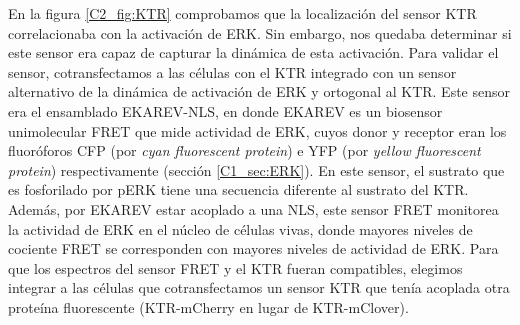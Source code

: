 \documentclass[./main.tex]{subfiles}
\begin{document}
En la figura \ref{C2_fig:KTR} comprobamos que la localización del sensor KTR correlacionaba con la activación de ERK. Sin embargo, nos quedaba determinar si este sensor era capaz de capturar la dinámica de esta activación. Para validar el sensor, cotransfectamos a las células con el KTR integrado con un sensor alternativo de la dinámica de activación de ERK y ortogonal al KTR. Este sensor era el ensamblado EKAREV-NLS, en donde EKAREV es un biosensor unimolecular FRET que mide actividad de ERK, cuyos donor y receptor eran los fluoróforos CFP (por \textit{cyan fluorescent protein}) e YFP (por \textit{yellow fluorescent protein}) respectivamente \cite{Komatsu2011} (sección \ref{C1_sec:ERK}). En este sensor, el sustrato que es fosforilado por pERK tiene una secuencia diferente al sustrato del KTR. Además, por EKAREV estar acoplado a una NLS, este sensor FRET monitorea la actividad de ERK en el núcleo de células vivas, donde mayores niveles de cociente FRET se corresponden con mayores niveles de actividad de ERK. Para que los espectros del sensor FRET y el KTR fueran compatibles, elegimos integrar a las células que cotransfectamos un sensor KTR que tenía acoplada otra proteína fluorescente (KTR-mCherry en lugar de KTR-mClover).
\end{document}
